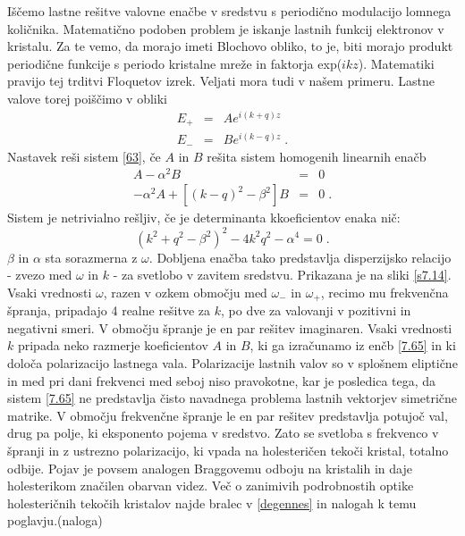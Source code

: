 Iščemo lastne rešitve valovne enačbe v sredstvu s periodično modulacijo
lomnega količnika. Matematično podoben problem je iskanje lastnih
funkcij elektronov v kristalu. Za te vemo, da morajo imeti Blochovo
obliko, to je, biti morajo produkt periodične funkcije s periodo kristalne
mreže in faktorja exp($ikz$). Matematiki pravijo tej trditvi Floquetov
izrek. Veljati mora tudi v našem primeru. Lastne valove torej poiščimo
v obliki 
\begin{eqnarray}
E_{+} & = & Ae^{i(k+q)z}\nonumber \\
E_{-} & = & Be^{i(k-q)z}\;.
\end{eqnarray}
 Nastavek reši sistem \ref{63}, če $A$ in $B$ rešita sistem homogenih
linearnih enačb 
\begin{eqnarray}
[(k+q)^{2}-\beta^{2}]A-\alpha^{2}B & = & 0\nonumber \\
-\alpha^{2}A+[(k-q)^{2}-\beta^{2}]B & = & 0\;.
\end{eqnarray}
 Sistem je netrivialno rešljiv, če je determinanta kkoeficientov enaka
nič: 
\begin{equation}
(k^{2}+q^{2}-\beta^{2})^{2}-4k^{2}q^{2}-\alpha^{4}=0\;.\label{7.66}
\end{equation}
 $\beta$ in $\alpha$ sta sorazmerna z $\omega$. Dobljena enačba
tako predstavlja disperzijsko relacijo - zvezo med $\omega$ in $k$
- za svetlobo v zavitem sredstvu. Prikazana je na sliki \ref{s7.14}.
Vsaki vrednosti $\omega$, razen v ozkem območju med $\omega_{-}$
in $\omega_{+}$, recimo mu frekvenčna špranja, pripadajo 4 realne
rešitve za $k$, po dve za valovanji v pozitivni in negativni smeri.
V območju špranje je en par rešitev imaginaren. Vsaki vrednosti $k$
pripada neko razmerje koeficientov $A$ in $B$, ki ga izračunamo
iz enčb \ref{7.65} in ki določa polarizacijo lastnega vala. Polarizacije
lastnih valov so v splošnem eliptične in med pri dani frekvenci med
seboj niso pravokotne, kar je posledica tega, da sistem \ref{7.65}
ne predstavlja čisto navadnega problema lastnih vektorjev simetrične
matrike. V območju frekvenčne špranje le en par rešitev predstavlja
potujoč val, drug pa polje, ki eksponento pojema v sredstvo. Zato
se svetloba s frekvenco v špranji in z ustrezno polarizacijo, ki vpada
na holesteričen tekoči kristal, totalno odbije. Pojav je povsem analogen
Braggovemu odboju na kristalih in daje holesterikom značilen obarvan
videz. Več o zanimivih podrobnostih optike holesteričnih tekočih kristalov
najde bralec v \ref{degennes} in nalogah k temu poglavju.(naloga)

